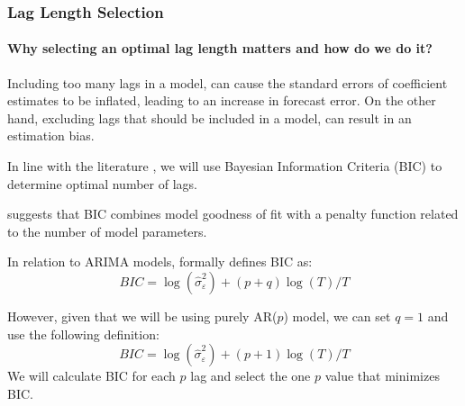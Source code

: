 \begin{frame}[allowframebreaks]
    \frametitle{Lag Length Selection}
    \framesubtitle{Why selecting an optimal lag length matters and how do we do it?}

    \begin{center}
        Including too many lags in a model, can cause the standard errors of coefficient estimates to be inflated, leading to an increase in forecast error. On the other hand, excluding lags that should be included in a model, can result in an estimation bias.
    \end{center}

    \begin{center}
        In line with the literature \parencite{ghysels_2018_applied}, we will use Bayesian Information Criteria (BIC) to determine optimal number of lags.
    \end{center}

    \begin{center}
        \cite[187]{ghysels_2018_applied} suggests that BIC combines model goodness of fit with a penalty function related to the number of model parameters.
    \end{center}
    \begin{center}
        In relation to ARIMA models, \cite[187]{ghysels_2018_applied} formally defines BIC as:
        $$B I C=\log \left(\hat{\sigma}_{\varepsilon}^2\right)+(p+q) \log (T) / T$$
    \end{center}

    \begin{center}
        However, given that we will be using purely AR($p$) model, we can set $q=1$ and use the following definition:
        $$B I C=\log \left(\hat{\sigma}_{\varepsilon}^2\right)+(p+1) \log (T) / T$$
        We will calculate BIC for each $p$ lag and select the one $p$ value that minimizes BIC.
    \end{center}

\end{frame}